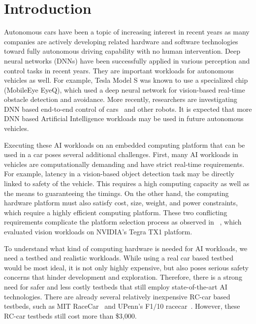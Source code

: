 \section{Introduction} \label{sec:intro}

%
%
Autonomous cars have been a topic of increasing interest in recent
years as many companies are actively developing related hardware
and software technologies toward fully autonomous driving capability with
no human intervention. Deep neural networks (DNNs) have been
successfully applied in various perception and control tasks in
recent years.  They are important workloads for autonomous vehicles
as well. For example, Tesla Model S was known to use a specialized
chip (MobileEye EyeQ), which used a deep neural network for vision-based
real-time obstacle detection and avoidance. More recently, researchers
are investigating DNN based end-to-end control of
cars~\cite{Bojarski2016} and other robots. It is expected that more
DNN based Artificial Intelligence workloads may be used in future
autonomous vehicles.

Executing these AI workloads on an embedded computing platform that can
be used in a car poses several additional challenges. First, many AI
workloads in vehicles are computationally demanding and have strict
real-time requirements. For example, latency in a vision-based object
detection task may be directly linked to safety of the vehicle. This
requires a high computing capacity as well as the means to guaranteeing
the timings. On the other hand, the computing hardware platform must
also satisfy cost, size, weight, and power constraints, which require a
highly efficient computing platform. These two conflicting
requirements  complicate the platform selection process as observed in
~\cite{Otterness2017}, which evaluated vision workloads on
NVIDIA's Tegra TX1 platform.


To understand what kind of computing hardware is needed for AI
workloads, we need a testbed and realistic workloads. While using a real car
based testbed would be most ideal, it is not only highly expensive, but also
poses serious safety concerns that hinder development and exploration.
Therefore, there is a strong need for safer and less costly testbeds
that still employ state-of-the-art AI technologies. There are already
several relatively inexpensive RC-car based testbeds, such as MIT
RaceCar~\cite{shin2017project} and UPenn's F1$/$10 racecar~\cite{upennf1tenth}.
However, these RC-car testbeds still cost more than \$3,000.

